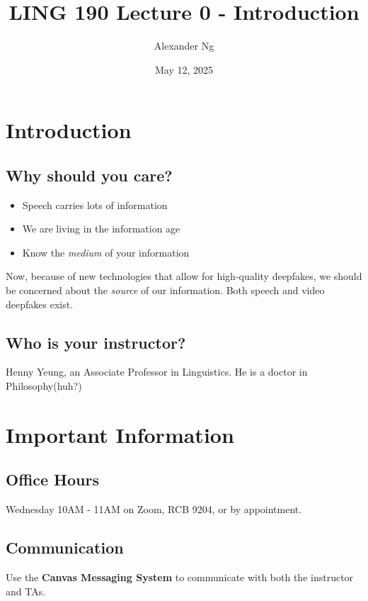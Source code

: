 \documentclass[12pt]{article}
\begin{document}
\title{LING 190 Lecture 0 - Introduction}
\author{Alexander Ng}
\date{May 12, 2025}

\maketitle

\section{Introduction}

\subsection{Why should you care?}

\begin{itemize}
  \item Speech carries lots of information
  \item We are living in the information age
  \item Know the \textit{medium} of your information
\end{itemize}

Now, because of new technologies that allow for high-quality deepfakes, we
should be concerned about the \textit{source} of our information. Both speech
and video deepfakes exist.

\subsection{Who is your instructor?}

Henny Yeung, an Associate Professor in Linguistics. He is a doctor in 
Philosophy(huh?)

\section{Important Information}

\subsection{Office Hours}
Wednesday 10AM - 11AM on Zoom, RCB 9204, or by appointment.

\subsection{Communication}
Use the \textbf{Canvas Messaging System} to communicate with both the instructor
and TAs.
\end{document}
